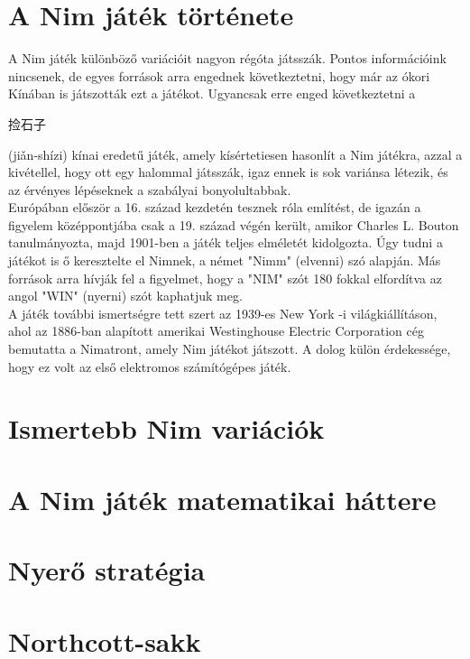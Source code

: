 \section{A Nim játék története}
A Nim játék különböző variációit nagyon régóta játsszák. Pontos információink nincsenek, de egyes források arra engednek következtetni, hogy már az ókori Kínában is játszották ezt a játékot. Ugyancsak erre enged következtetni a \begin{CJK*}{UTF8}{gbsn}捡石子\end{CJK*}
(jiǎn-shízi) kínai eredetű játék, amely kísértetiesen hasonlít a Nim játékra, azzal a kivétellel, hogy ott egy halommal játsszák, igaz ennek is sok variánsa létezik, és az érvényes lépéseknek a szabályai bonyolultabbak. \\
Európában először a 16. század kezdetén tesznek róla említést, de igazán a figyelem középpontjába csak a 19. század végén került, amikor Charles L. Bouton tanulmányozta, majd 1901-ben a játék teljes elméletét kidolgozta. Úgy tudni a játékot is ő keresztelte el Nimnek, a német "Nimm" (elvenni) szó alapján. Más források arra hívják fel a figyelmet, hogy a "NIM" szót 180 fokkal elfordítva az angol "WIN" (nyerni) szót kaphatjuk meg. \\
A játék további ismertségre tett szert az 1939-es New York -i világkiállításon, ahol az 1886-ban alapított amerikai Westinghouse Electric Corporation cég bemutatta a Nimatront, amely Nim játékot játszott. A dolog külön érdekessége, hogy ez volt az első elektromos számítógépes játék.

\section{Ismertebb Nim variációk}


\section{A Nim játék matematikai háttere}

\section{Nyerő stratégia}

\section{Northcott-sakk}
